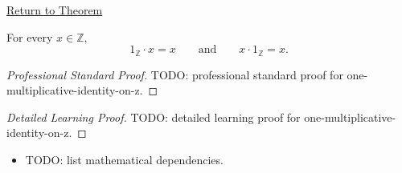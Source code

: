 \newpage
{}
\label{prf:one-multiplicative-identity-on-z}

\begin{remark*}[Return]
\hyperref[thm:one-multiplicative-identity-on-z]{Return to Theorem}
\end{remark*}

\begin{theorem*}
For every $x\in\mathbb{Z}$,
\[
1_{\mathbb{Z}}\cdot x=x
\qquad\text{and}\qquad
x\cdot 1_{\mathbb{Z}}=x.
\]
\end{theorem*}

\begin{proof}[Professional Standard Proof]
\LRAProofBodyStart
TODO: professional standard proof for one-multiplicative-identity-on-z.
\end{proof}

\begin{proof}[Detailed Learning Proof]
\LRAProofBodyStart
TODO: detailed learning proof for one-multiplicative-identity-on-z.
\end{proof}

\begin{remark*}
\end{remark*}

\begin{dependencies}
\begin{itemize}
  \item TODO: list mathematical dependencies.
\end{itemize}
\end{dependencies}

\clearpage

